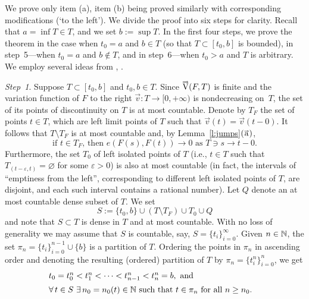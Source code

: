 \documentclass[preprint,12pt]{elsarticle}
\newcommand{\es}{\varnothing}
\newcommand{\vep}{\varepsilon}
\newcommand{\riV}{{\scriptstyle\overrightarrow{\mbox{\rm V}}}}
\newcommand{\ori}[1]{{\scriptscriptstyle\overrightarrow{\mbox{$#1$}}}}
\begin{document}
\begin{pfBV}
We prove only item (a), item (b) being proved similarly with corresponding modifications
(`to the left'). We divide the proof into six steps for clarity.
Recall that $a=\inf T\in T$, and we set $b:=\sup T$.
In the first four steps, we prove the theorem in the case when $t_0=a$
and $b\in T$ (so that $T\subset[t_0,b]$ is bounded), in step~5---when $t_0=a$ and
$b\notin T$, and in step~6---when $t_0\!>\!a$ and $T$ is arbitrary.
We employ several ideas from \cite{JMAA,MatSb}, \cite[Sections~5,~10]{Sovae}.

\smallbreak
{\it Step~1}. Suppose $T\subset[t_0,b]$ and $t_0,b\in T$. Since $\riV(F,T)$ is finite
and the variation function of $F$ to the right $\ori{v}:T\to[0,+\infty)$ is nondecreasing
on~$T$, the set of its points of discontinuity on $T$ is at most countable. Denote by
$T_F$ the set of points $t\in T$, which are left limit points of $T$ such that
$\ori{v}(t)=\ori{v}(t-0)$. It follows that $T\setminus T_F$ is at most countable and,
by Lemma~\ref{l:jumps}${\rm(\ori{\mbox{\rm a}})}$,
  \begin{equation} \label{e:FsFt}
\mbox{if $t\in T_F$, then $e(F(s),F(t))\to0$ as $T\ni s\to t-0$.}
  \end{equation}
Furthermore, the set $T_0$ of left isolated points of $T$
(i.e., $t\in T$ such that $T_{(t-\vep,t)}=\es$ for some $\vep>0$) is also at most
countable (in fact, the intervals of ``emptiness from the left'', corresponding to
different left isolated points of $T$, are disjoint, and each such interval contains
a rational number). Let $Q$ denote an at most countable dense subset of $T$. We set
  \begin{equation*}
S\!:=\{t_0,b\}\cup(T\setminus T_F)\cup T_0\cup Q
  \end{equation*}
and note that $S\subset T$ is dense in $T$ and at most countable. With no loss
of generality we may assume that $S$ is countable, say, $S=\{t_i\}_{i=0}^\infty$.
Given $n\in\mathbb{N}$, the set $\pi_n=\{t_i\}_{i=0}^{n-1}\cup\{b\}$ is a partition of $T$.
Ordering the points in $\pi_n$ in ascending order and denoting the resulting (ordered)
partition of $T$ by $\pi_n=\{t_i^n\}_{i=0}^n$, we get
  \begin{eqnarray}
&\mbox{$t_0=t_0^n<t_1^n<\dots<t_{n-1}^n<t_n^n=b$, \,and}&\label{e:op}\\[2pt]
&\mbox{$\forall\,t\in S$ $\exists\,n_0=n_0(t)\in\mathbb{N}$ such that $t\in\pi_n$
  for all $n\ge n_0$.}& \label{e:noN}
  \end{eqnarray}


\end{pfBV}
\end{document}
